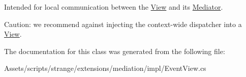 Intended for local communication between the \hyperlink{classstrange_1_1extensions_1_1mediation_1_1impl_1_1_view}{View} and its \hyperlink{classstrange_1_1extensions_1_1mediation_1_1impl_1_1_mediator}{Mediator}.

Caution\-: we recommend against injecting the context-\/wide dispatcher into a \hyperlink{classstrange_1_1extensions_1_1mediation_1_1impl_1_1_view}{View}. 

The documentation for this class was generated from the following file\-:\begin{DoxyCompactItemize}
\item 
Assets/scripts/strange/extensions/mediation/impl/Event\-View.\-cs\end{DoxyCompactItemize}
